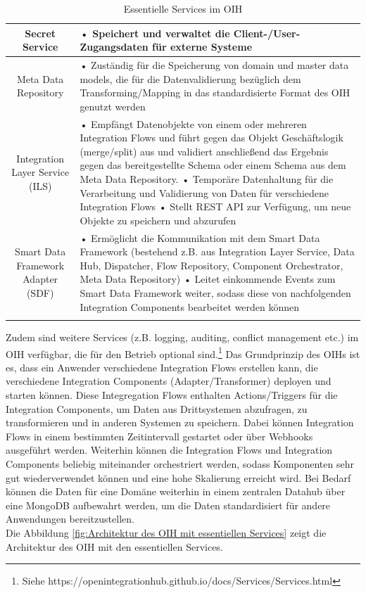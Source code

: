 \begin{longtable}{|c|p{} |}
Secret Service & •	Speichert und verwaltet die Client-/User-Zugangsdaten für externe Systeme \\ \hline
Meta Data Repository & •	Zuständig für die Speicherung von domain und master data models, die für die Datenvalidierung bezüglich dem Transforming/Mapping in das standardisierte Format des OIH genutzt werden \\ \hline
Integration Layer Service (ILS) & •	Empfängt Datenobjekte von einem oder mehreren Integration Flows und führt gegen das Objekt Geschäftslogik (merge/split) aus und validiert anschließend das Ergebnis gegen das bereitgestellte Schema oder einem Schema aus dem Meta Data Repository.
\newline •	Temporäre Datenhaltung für die Verarbeitung und Validierung von Daten für verschiedene Integration Flows
\newline •	Stellt REST API zur Verfügung, um neue Objekte zu speichern und abzurufen \\ \hline
Smart Data Framework Adapter (SDF) & •	Ermöglicht die Kommunikation mit dem Smart Data Framework (bestehend z.B. aus Integration Layer Service, Data Hub, Dispatcher, Flow Repository, Component Orchestrator, Meta Data Repository)
\newline •	Leitet einkommende Events zum Smart Data Framework weiter, sodass diese von nachfolgenden Integration Components bearbeitet werden können \\ \hline
\caption{Essentielle Services im OIH}
\label{tab:Essentielle Services im OIH}
\end{longtable}

Zudem sind weitere Services (z.B. logging, auditing, conflict management etc.) im OIH verfügbar, die für den Betrieb optional sind.\footnote{Siehe https://openintegrationhub.github.io/docs/Services/Services.html}
Das Grundprinzip des OIHs ist es, dass ein Anwender verschiedene Integration Flows erstellen kann, die verschiedene Integration Components (Adapter/Transformer) deployen und starten können. Diese Integregation Flows enthalten Actions/Triggers für die Integration Components, um Daten aus Drittsystemen abzufragen, zu transformieren und in anderen Systemen zu speichern. Dabei können Integration Flows in einem bestimmten Zeitintervall gestartet oder über Webhooks ausgeführt werden. Weiterhin können die Integration Flows und Integration Components beliebig miteinander orchestriert werden, sodass Komponenten sehr gut wiederverwendet können und eine hohe Skalierung erreicht wird. Bei Bedarf können die Daten für eine Domäne weiterhin in einem zentralen Datahub über eine MongoDB aufbewahrt werden, um die Daten standardisiert für andere Anwendungen bereitzustellen. \\
Die Abbildung \ref{fig:Architektur des OIH mit essentiellen Services} zeigt die Architektur des OIH mit den essentiellen Services.

